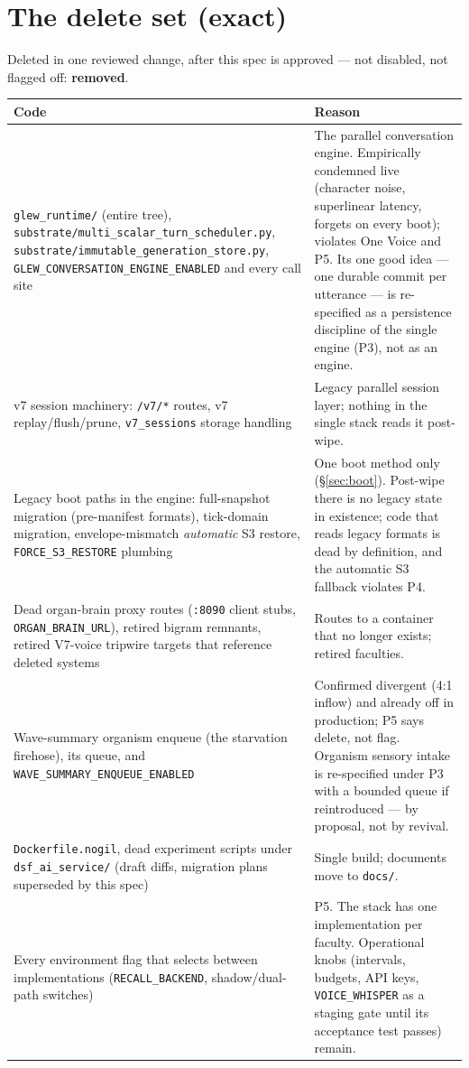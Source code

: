 \documentclass[11pt]{article}
\begin{document}
\section{The delete set (exact)}\label{sec:delete}

Deleted in one reviewed change, after this spec is approved — not disabled,
not flagged off: \textbf{removed}.

\begin{longtable}{p{} p{}}
\toprule
\textbf{Code} & \textbf{Reason} \\
\midrule
\texttt{glew\_runtime/} (entire tree),
\texttt{substrate/multi\_scalar\_turn\_scheduler.py},
\texttt{substrate/immutable\_generation\_store.py},
\texttt{GLEW\_CONVERSATION\_ENGINE\_ENABLED} and every call site &
The parallel conversation engine. Empirically condemned live (character
noise, superlinear latency, forgets on every boot); violates One Voice and
P5. Its one good idea — one durable commit per utterance — is re-specified
as a persistence discipline of the single engine (P3), not as an engine. \\
\midrule
v7 session machinery: \texttt{/v7/*} routes, v7 replay/flush/prune,
\texttt{v7\_sessions} storage handling &
Legacy parallel session layer; nothing in the single stack reads it
post-wipe. \\
\midrule
Legacy boot paths in the engine: full-snapshot migration
(pre-manifest formats), tick-domain migration, envelope-mismatch
\emph{automatic} S3 restore, \texttt{FORCE\_S3\_RESTORE} plumbing &
One boot method only (\S\ref{sec:boot}). Post-wipe there is no legacy state
in existence; code that reads legacy formats is dead by definition, and the
automatic S3 fallback violates P4. \\
\midrule
Dead organ-brain proxy routes (\texttt{:8090} client stubs,
\texttt{ORGAN\_BRAIN\_URL}), retired bigram remnants, retired V7-voice
tripwire targets that reference deleted systems &
Routes to a container that no longer exists; retired faculties. \\
\midrule
Wave-summary organism enqueue (the starvation firehose), its queue, and
\texttt{WAVE\_SUMMARY\_ENQUEUE\_ENABLED} &
Confirmed divergent (4:1 inflow) and already off in production; P5 says
delete, not flag. Organism sensory intake is re-specified under P3 with a
bounded queue if reintroduced — by proposal, not by revival. \\
\midrule
\texttt{Dockerfile.nogil}, dead experiment scripts under
\texttt{dsf\_ai\_service/} (draft diffs, migration plans superseded by this
spec) &
Single build; documents move to \texttt{docs/}. \\
\midrule
Every environment flag that selects between implementations
(\texttt{RECALL\_BACKEND}, shadow/dual-path switches) &
P5. The stack has one implementation per faculty. Operational knobs
(intervals, budgets, API keys, \texttt{VOICE\_WHISPER} as a staging gate
until its acceptance test passes) remain. \\
\bottomrule
\end{longtable}
\end{document}
